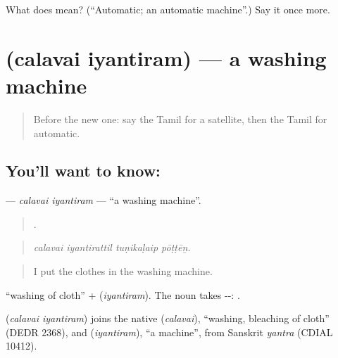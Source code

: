 \begin{tcolorbox}[breakable,colback=teal!4,colframe=teal!35!black,title={Before you move on}]
What does  mean? (\textquotedblleft{}Automatic; an automatic machine\textquotedblright{}.) Say it once more.
\end{tcolorbox}
\section[\texorpdfstring{\ta{சலவை} \ta{இயந்திரம்} (calavai iyantiram)}{சலவை இயந்திரம் (calavai iyantiram)}]{  (calavai iyantiram) — a washing machine}

\label{lesson:TA-C520-calavai-iyantiram}



\begin{quote}
Before the new one: say the Tamil for a satellite, then the Tamil for automatic.
\end{quote}

\subsection*{You'll want to know:  }
\textbf{ } — \emph{calavai iyantiram} — \textquotedblleft{}a washing machine\textquotedblright{}.

\begin{quote}
   .
\end{quote}

\begin{quote}
\emph{calavai iyantirattil tuṇikaḷaip pōṭṭēṉ.}
\end{quote}

\begin{quote}
I put the clothes in the washing machine.
\end{quote}

 \textquotedblleft{}washing of cloth\textquotedblright{} +  (\emph{iyantiram}). The noun takes --: .

\begin{cousinweb}
\textbf{ } (\emph{calavai iyantiram}) joins the native  (\emph{calavai}), \textquotedblleft{}washing, bleaching of cloth\textquotedblright{} (DEDR 2368), and  (\emph{iyantiram}), \textquotedblleft{}a machine\textquotedblright{}, from Sanskrit \emph{yantra} (CDIAL 10412).
\end{cousinweb}

